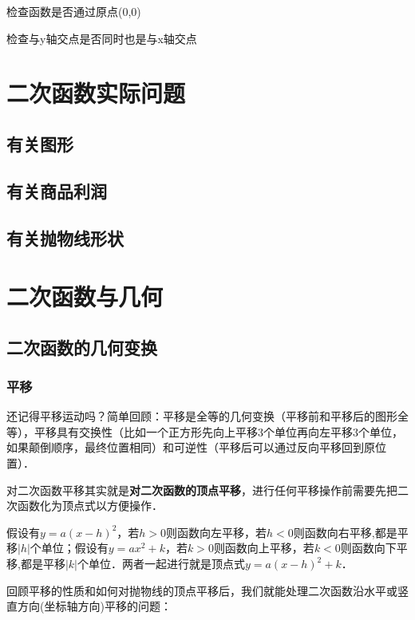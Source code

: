 \documentclass[lang=cn, 10pt, titlestyle=display, oneside, toc=twocol]{elegantbook}
\begin{document}
检查函数是否通过原点(0,0)

检查与y轴交点是否同时也是与x轴交点

\section{二次函数实际问题}


\subsection*{有关图形}

\subsection*{有关商品利润}

\subsection*{有关抛物线形状}

\section{二次函数与几何}



\subsection{二次函数的几何变换}

\subsubsection*{平移}
还记得平移运动吗？简单回顾：平移是全等的几何变换（平移前和平移后的图形全等），平移具有交换性（比如一个正方形先向上平移3个单位再向左平移3个单位，如果颠倒顺序，最终位置相同）和可逆性（平移后可以通过反向平移回到原位置）．
\par
对二次函数平移其实就是\textbf{对二次函数的顶点平移}，进行任何平移操作前需要先把二次函数化为顶点式以方便操作．
\par
假设有\(y=a(x-h)^2\)，若\(h>0\)则函数向左平移，若\(h<0\)则函数向右平移,都是平移\(|h|\)个单位；假设有\(y=ax^2+k\)，若\(k>0\)则函数向上平移，若\(k<0\)则函数向下平移,都是平移\(|k|\)个单位．两者一起进行就是顶点式\(y=a(x-h)^2+k\)．
\par
回顾平移的性质和如何对抛物线的顶点平移后，我们就能处理二次函数沿水平或竖直方向(坐标轴方向)平移的问题：
\end{document}
